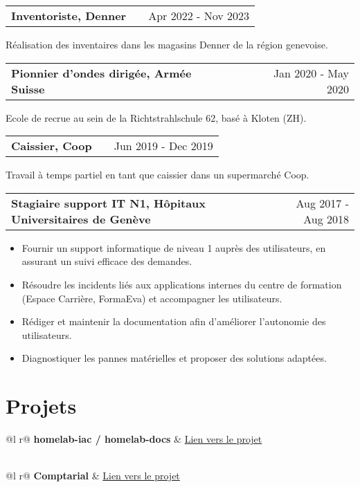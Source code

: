 \documentclass[a4paper,11pt]{article}
\makeatletter
\newenvironment{jobshort}[2]
    {
    \begin{tabularx}{\linewidth}{@{}l X r@{}}
    \textbf{#1} & \hfill &  #2 \\[3.75pt]
    \end{tabularx}
    }
    {
    }
\newenvironment{joblong}[2]
    {
    \begin{tabularx}{\linewidth}{@{}l X r@{}}
    \textbf{#1} & \hfill &  #2 \\[3.75pt]
    \end{tabularx}
    \begin{minipage}[t]{\linewidth}
    \begin{itemize}[nosep,after=\strut, leftmargin=1em, itemsep=3pt,label=--]
    }
    {
    \end{itemize}
    \end{minipage}
    }
\makeatother
\begin{document}
\begin{jobshort}{Inventoriste, Denner}{Apr 2022 - Nov 2023}
    Réalisation des inventaires dans les magasins Denner de la région genevoise.
\end{jobshort}

\begin{jobshort}{Pionnier d’ondes dirigée, Armée Suisse}{Jan 2020 - May 2020}
    Ecole de recrue au sein de la Richtstrahlschule 62, basé à Kloten (ZH).
\end{jobshort}

\begin{jobshort}{Caissier, Coop}{Jun 2019 - Dec 2019}
    Travail à temps partiel en tant que caissier dans un supermarché Coop.
\end{jobshort}

\begin{joblong}{Stagiaire support IT N1, Hôpitaux Universitaires de Genève}{Aug 2017 - Aug 2018}
\item Fournir un support informatique de niveau 1 auprès des utilisateurs, en assurant un suivi efficace des demandes.
\item Résoudre les incidents liés aux applications internes du centre de formation (Espace Carrière, FormaEva) et accompagner les utilisateurs.
\item Rédiger et maintenir la documentation afin d’améliorer l’autonomie des utilisateurs.
\item Diagnostiquer les pannes matérielles et proposer des solutions adaptées.
\end{joblong}

\section{Projets}

\begin{tabularx}{\linewidth}{ @{}l r@{} }
\textbf{homelab-iac / homelab-docs} & \hfill \href{https://boranuzun.github.io/homelab-docs}{Lien vers le projet} \\[3.75pt]
  \\
\end{tabularx}

\begin{tabularx}{\linewidth}{ @{}l r@{} }
\textbf{Comptarial} & \hfill \href{https://github.com/heg-comptarial/comptarial}{Lien vers le projet} \\[3.75pt]
  \\
\end{tabularx}
\end{document}
